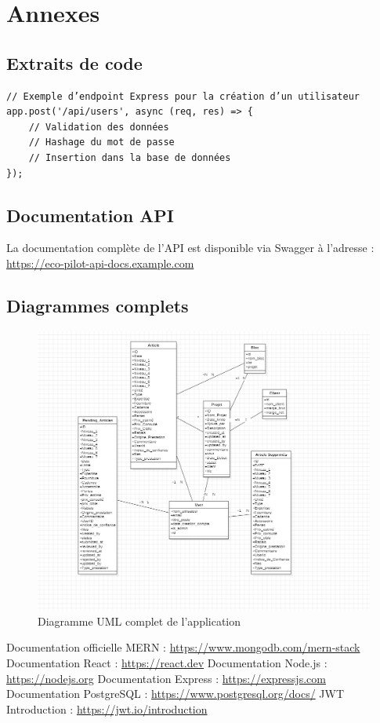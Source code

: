 \documentclass[12pt,a4paper]{report}
\begin{document}
\appendix
\chapter{Annexes}
\section{Extraits de code}

\begin{verbatim}
// Exemple d’endpoint Express pour la création d’un utilisateur
app.post('/api/users', async (req, res) => {
    // Validation des données
    // Hashage du mot de passe
    // Insertion dans la base de données
});
\end{verbatim}

\section{Documentation API}

La documentation complète de l’API est disponible via Swagger à l’adresse :\\
\url{https://eco-pilot-api-docs.example.com}

\section{Diagrammes complets}

\begin{figure}[H]
    \centering
    \includegraphics[width=0.8\linewidth]{image.png}
    \caption{Diagramme UML complet de l’application}
\end{figure}

\begin{thebibliography}{9}
 Documentation officielle MERN : \url{https://www.mongodb.com/mern-stack}
 Documentation React : \url{https://react.dev}
 Documentation Node.js : \url{https://nodejs.org}
 Documentation Express : \url{https://expressjs.com}
 Documentation PostgreSQL : \url{https://www.postgresql.org/docs/}
 JWT Introduction : \url{https://jwt.io/introduction}
\end{thebibliography}
\end{document}
